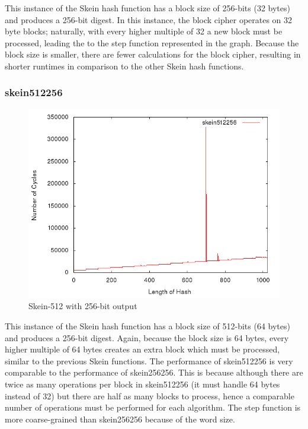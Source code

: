 \documentclass[10pt,a4paper]{article}
\begin{document}
This instance of the Skein hash function has a block size of 256-bits (32 bytes) and produces a 256-bit digest.  In this instance, the block cipher operates on 32 byte blocks; naturally, with every higher multiple of 32 a new block must be processed, leading the to the step function represented in the graph.  Because the block size is smaller, there are fewer calculations for the block cipher, resulting in shorter runtimes in comparison to the other Skein hash functions.

\subsubsection{skein512256}

    \begin{figure}[H]
        \begin{center}
            \includegraphics[scale=0.5]{images/skein512256.png} 
            \caption{Skein-512 with 256-bit output}
        \end{center}
    \end{figure}

This instance of the Skein hash function has a block size of 512-bits (64 bytes) and produces a 256-bit digest.  Again, because the block size is 64 bytes, every higher multiple of 64 bytes creates an extra block which must be processed, similar to the previous Skein functions.  The performance of skein512256 is very comparable to the performance of skein256256.  This is because although there are twice as many operations per block in skein512256 (it must handle 64 bytes instead of 32) but there are half as many blocks to process, hence a comparable number of operations must be performed for each algorithm.  The step function is more coarse-grained than skein256256 because of the word size.
\end{document}
